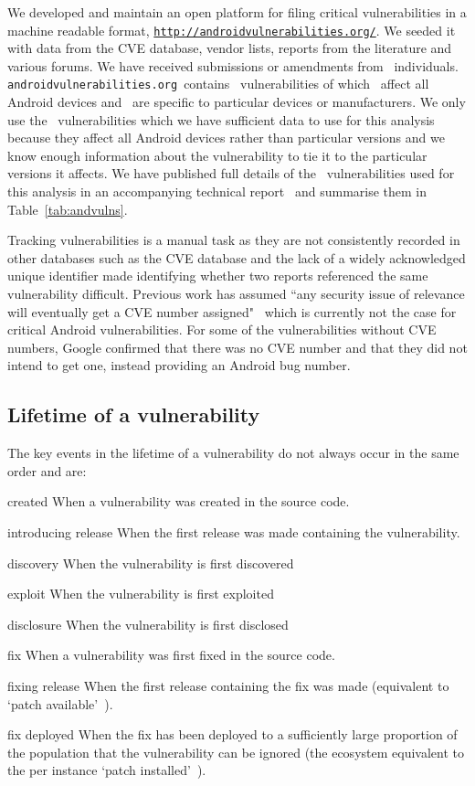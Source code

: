 \documentclass[conference,a4paper,twoside]{IEEEtran}
\newcommand{\avo}{\texttt{androidvulnerabilities.org}}
\begin{document}
We developed and maintain an open platform for filing critical vulnerabilities in a machine readable format, \texttt{\url{http://androidvulnerabilities.org/}}.
We seeded it with data from the CVE database, vendor lists, reports from the literature and various forums.
We have received submissions or amendments from \avoNumSubmitters\ individuals.
\avo\ contains \avoNumVulnerabilities\ vulnerabilities of which \avoNumVulnAllAndroid\ affect all Android devices and \avoNumVulnSpecific\ are specific to particular devices or manufacturers.
We only use the \daNumVulnsUsed\ vulnerabilities which we have sufficient data to use for this analysis because they affect all Android devices rather than particular versions and we know enough information about the vulnerability to tie it to the particular versions it affects.
We have published full details of the \daNumVulnsUsed\ vulnerabilities used for this analysis in an accompanying technical report~\cite{TODO} and summarise them in Table~\ref{tab:andvulns}.


Tracking vulnerabilities is a manual task as they are not consistently recorded in other databases such as the CVE database and the lack of a widely acknowledged unique identifier made identifying whether two reports referenced the same vulnerability difficult.
Previous work has assumed ``any security issue of relevance will eventually get a CVE number assigned"~\cite{Frei2010} which is currently not the case for critical Android vulnerabilities.
For some of the vulnerabilities without CVE numbers, Google confirmed that there was no CVE number and that they did not intend to get one, instead providing an Android bug number.


\subsection{Lifetime of a vulnerability}

The key events in the lifetime of a vulnerability do not always occur in the same order and are:

\begin{LaTeXdescription}
 \item[created] When a vulnerability was created in the source code.
 \item[introducing release] When the first release was made containing the vulnerability.
 \item[discovery] When the vulnerability is first discovered
 \item[exploit] When the vulnerability is first exploited
 \item[disclosure] When the vulnerability is first disclosed %
 \item[fix] When a vulnerability was first fixed in the source code.
 \item[fixing release] When the first release containing the fix was made (equivalent to `patch available'~\cite{Frei2010}).
 \item[fix deployed] When the fix has been deployed to a sufficiently large proportion of the population that the vulnerability can be ignored (the ecosystem equivalent to the per instance `patch installed'~\cite{Frei2010}).
\end{LaTeXdescription}
\end{document}
